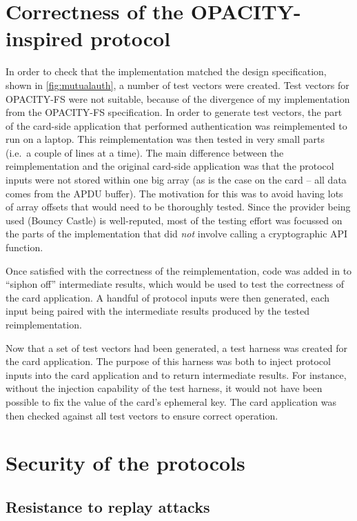 \documentclass[12pt,a4paper,twoside,openright]{report}
\begin{document}
\section{Correctness of the OPACITY-inspired protocol}

In order to check that the implementation matched the design specification, shown in \autoref{fig:mutualauth}, a number of test vectors were created. Test vectors for OPACITY-FS were not suitable, because of the divergence of my implementation from the OPACITY-FS specification. In order to generate test vectors, the part of the card-side application that performed authentication was reimplemented to run on a laptop. This reimplementation was then tested in very small parts (i.e.\ a couple of lines at a time). The main difference between the reimplementation and the original card-side application was that the protocol inputs were not stored within one big array (as is the case on the card -- all data comes from the APDU buffer). The motivation for this was to avoid having lots of array offsets that would need to be thoroughly tested. Since the provider being used (Bouncy Castle) is well-reputed, most of the testing effort was focussed on the parts of the implementation that did \emph{not} involve calling a cryptographic API function.

Once satisfied with the correctness of the reimplementation, code was added in to ``siphon off'' intermediate results, which would be used to test the correctness of the card application. A handful of protocol inputs were then generated, each input being paired with the intermediate results produced by the tested reimplementation.

Now that a set of test vectors had been generated, a test harness was created for the card application. The purpose of this harness was both to inject protocol inputs into the card application and to return intermediate results. For instance, without the injection capability of the test harness, it would not have been possible to fix the value of the card's ephemeral key. The card application was then checked against all test vectors to ensure correct operation.

\section{Security of the protocols}

\subsection{Resistance to replay attacks}
\end{document}
